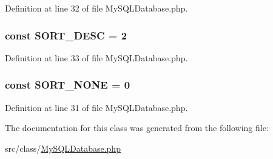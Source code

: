 Definition at line 32 of file My\+S\+Q\+L\+Database.\+php.

\hypertarget{class_my_s_q_l_database_a0e633ab431ae1e5cc483a37cfe73bb09}{}
\subsubsection[{S\+O\+R\+T\+\_\+\+D\+E\+S\+C}]{\setlength{\rightskip}{0pt plus 5cm}const S\+O\+R\+T\+\_\+\+D\+E\+S\+C = 2}\label{class_my_s_q_l_database_a0e633ab431ae1e5cc483a37cfe73bb09}


Definition at line 33 of file My\+S\+Q\+L\+Database.\+php.

\hypertarget{class_my_s_q_l_database_af3826c676cb54905f393f9d1f7ad48ea}{}
\subsubsection[{S\+O\+R\+T\+\_\+\+N\+O\+N\+E}]{\setlength{\rightskip}{0pt plus 5cm}const S\+O\+R\+T\+\_\+\+N\+O\+N\+E = 0}\label{class_my_s_q_l_database_af3826c676cb54905f393f9d1f7ad48ea}


Definition at line 31 of file My\+S\+Q\+L\+Database.\+php.



The documentation for this class was generated from the following file\+:\begin{DoxyCompactItemize}
\item 
src/class/\hyperlink{_my_s_q_l_database_8php}{My\+S\+Q\+L\+Database.\+php}\end{DoxyCompactItemize}
